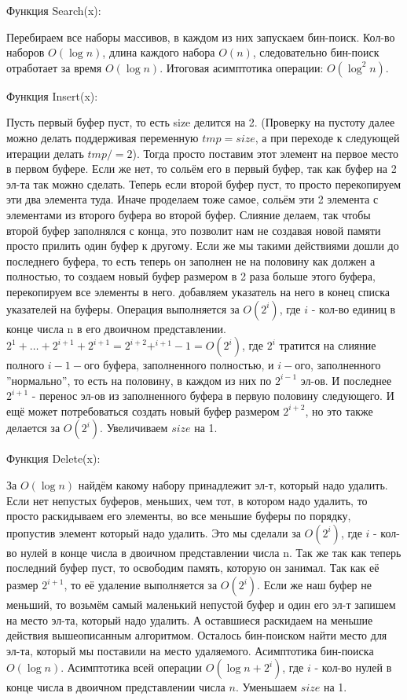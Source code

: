 \documentclass[12pt]{article}
\begin{document}
Функция Search(x):

Перебираем все наборы массивов, в каждом из них запускаем бин-поиск.
Кол-во наборов $O(\log n)$, длина каждого набора $O(n)$, следовательно бин-поиск
отработает за время $O(\log n)$.
Итоговая асимптотика операции: $O(\log^2 n)$.

Функция Insert(x):

Пусть первый буфер пуст, то есть size делится на 2. 
(Проверку на пустоту далее можно делать поддерживая переменную $tmp = size$, 
а при переходе к следующей итерации делать $tmp /= 2$).
Тогда просто поставим этот элемент на первое место в первом буфере.
Если же нет, то сольём его в первый буфер, так как буфер на 2 эл-та так можно сделать. 
Теперь если второй буфер пуст, то просто перекопируем эти два элемента туда.
Иначе проделаем тоже самое, сольём эти 2 элемента с элементами из второго буфера во второй буфер.
Слияние делаем, так чтобы второй буфер заполнялся с конца, 
это позволит нам не создавая новой памяти просто прилить один буфер к другому.
Если же мы такими действиями дошли до последнего буфера, то есть теперь он заполнен не на половину как должен а полностью, 
то создаем новый буфер размером в 2 раза больше этого буфера, перекопируем все элементы в него. добавляем указатель на него
в конец списка указателей на буферы.
Операция выполняется за $O(2^{i})$, где $i$ - кол-во единиц в конце числа n в его двоичном представлении.
$2^1+\ldots+2^{i+1} + 2^{i+1} = 2^{i+2} +^{i+1} - 1 = O(2^i)$,  
где $2^{i}$ тратится на слияние полного $i-1-ого$ буфера, заполненного полностью,
и $i-ого$, заполненного ''нормально'', то есть на половину, в каждом из них по $2^{i-1}$ эл-ов. 
И последнее $2^{i+1}$ - перенос эл-ов из заполненного буфера в первую половину следующего.
И ещё может потребоваться создать новый буфер размером $2^{i+2}$, но это также делается за $O(2^{i})$.
Увеличиваем $size$ на 1.

Функция Delete(x):

За $O(\log n)$ найдём какому набору принадлежит эл-т, который надо удалить.
Если нет непустых буферов, меньших, чем тот, в котором надо удалить, то просто раскидываем его элементы, 
во все меньшие буферы по порядку, пропустив элемент который надо удалить. 
Это мы сделали за $O(2^{i})$, где $i$ - кол-во нулей в конце числа в двоичном представлении числа n.
Так же так как теперь последний буфер пуст, то освободим память, которую он занимал.
Так как её размер $2^{i+1}$, то её удаление выполняется за $O(2^{i})$.
Если же наш буфер не меньший, то возьмём самый маленький непустой буфер и один его эл-т запишем на место эл-та, который надо удалить.
А оставшиеся раскидаем на меньшие действия вышеописанным алгоритмом. Осталось бин-поиском найти место для эл-та, который мы
поставили на место удаляемого. Асимптотика бин-поиска $O(\log n)$. Асимптотика всей операции $O(\log n + 2^{i})$, где $i$ - кол-во
нулей в конце числа в двоичном представлении числа $n$. 
Уменьшаем $size$ на 1.
\end{document}
